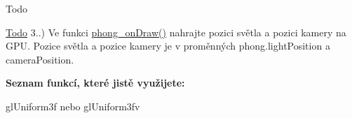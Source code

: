 \begin{DoxyRefDesc}{Todo}
\item[\hyperlink{todo__todo000010}{Todo}]3..) Ve funkci \hyperlink{student_8h_a53ffbb1a271d285abdaf7a029192f47e}{phong\-\_\-on\-Draw()} nahrajte pozici světla a pozici kamery na G\-P\-U. Pozice světla a pozice kamery je v proměnných phong.\-light\-Position a camera\-Position.\par
 {\bfseries Seznam funkcí, které jistě využijete\-:}
\begin{DoxyItemize}
\item gl\-Uniform3f nebo gl\-Uniform3fv 
\end{DoxyItemize}\end{DoxyRefDesc}
